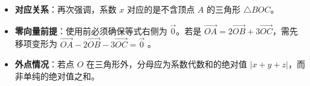 \begin{trapbox}
\begin{itemize}
    \item \textbf{对应关系}：再次强调，系数 $x$ 对应的是不含顶点 $A$ 的三角形 $\triangle BOC$。
    \item \textbf{零向量前提}：使用前必须确保等式右侧为 $\vec{0}$。若是 $\vec{OA} = 2\vec{OB} + 3\vec{OC}$，需先移项变形为 $\vec{OA} - 2\vec{OB} - 3\vec{OC} = \vec{0}$ 。
    \item \textbf{外点情况}：若点 $O$ 在三角形外，分母应为系数代数和的绝对值 $|x+y+z|$，而非单纯的绝对值之和。
\end{itemize}
\end{trapbox}
